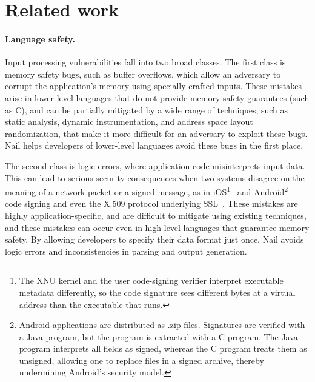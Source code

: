 \section{Related work}
\label{s:relwk}



\paragraph{Language safety.}

Input processing vulnerabilities fall into two broad classes.  The first
class is memory safety bugs, such as buffer overflows, which allow an
adversary to corrupt the application's memory using specially crafted
inputs.  These mistakes arise in lower-level languages that do not
provide memory safety guarantees (such as C), and can be partially
mitigated by a wide range of techniques, such as static analysis,
dynamic instrumentation, and address space layout randomization, that
make it more difficult for an adversary to exploit these bugs.
Nail helps developers of lower-level languages avoid these bugs
in the first place.

The second class is logic errors, where application code misinterprets
input data.  This can lead to serious security consequences when two
systems disagree on the meaning of a network packet or a signed message,
as in iOS\footnote{The XNU kernel and the user code-signing verifier
interpret executable metadata differently, so the code signature
sees different bytes at a virtual address than the executable that
runs.}~\cite{evaders6} and Android\footnote{Android applications
are distributed as .zip files. Signatures are verified with a Java
program, but the program is extracted with a C program.  The Java
program interprets all fields as signed, whereas the C program
treats them as unsigned, allowing one to replace files in a signed
archive, thereby undermining Android's security model.}~\cite{saurik-masterkey} code signing and even the X.509 protocol
underlying SSL~\cite{DBLP:conf/fc/KaminskyPS10}.  These mistakes are
highly application-specific, and are difficult to mitigate using existing
techniques, and these mistakes can occur even in high-level languages
that guarantee memory safety.
By allowing developers to specify their data format just once, Nail
avoids logic errors and inconsistencies in parsing and output generation.

